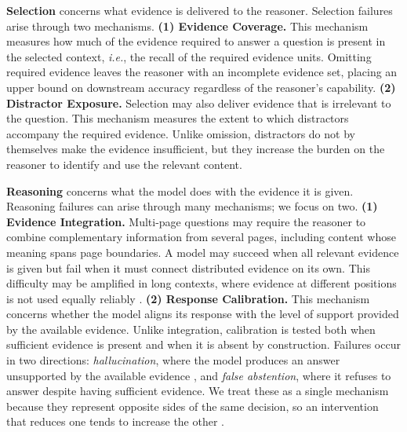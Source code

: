 \documentclass[11pt]{article}
\begin{document}
\textbf{Selection}
concerns what evidence is delivered to the reasoner. 
Selection failures arise through two mechanisms.
\textbf{(1) Evidence Coverage.} This mechanism measures how much of the evidence required to answer a question is present in the selected context, \emph{i.e.}, the recall of the required evidence units. Omitting required evidence leaves the reasoner with an incomplete evidence set, placing an upper bound on downstream accuracy regardless of the reasoner's capability.
\textbf{(2) Distractor Exposure.} Selection may also deliver evidence that is irrelevant to the question. This mechanism measures the extent to which distractors accompany the required evidence. Unlike omission, distractors do not by themselves make the evidence insufficient, but they increase the burden on the reasoner to identify and use the relevant content.

\textbf{Reasoning}
concerns what the model does with the evidence it is given. 
Reasoning failures can arise through many mechanisms; we focus on two.
\textbf{(1) Evidence Integration.} Multi-page questions may require the reasoner to combine complementary information from several pages, including content whose meaning spans page boundaries. A model may succeed when all relevant evidence is given but fail when it must connect distributed evidence on its own. This difficulty may be amplified in long contexts, where evidence at different positions is not used equally reliably \citep{liu2024lost}.
\textbf{(2) Response Calibration.} This mechanism concerns whether the model aligns its response with the level of support provided by the available evidence. Unlike integration, calibration is tested both when sufficient evidence is present and when it is absent by construction. Failures occur in two directions: \emph{hallucination}, where the model produces an answer unsupported by the available evidence \citep{li2023llmattribution}, and \emph{false abstention}, where it refuses to answer despite having sufficient evidence. We treat these as a single mechanism because they represent opposite sides of the same decision, so an intervention that reduces one tends to increase the other \citep{whitehead2022reliablevqa}.
\end{document}
